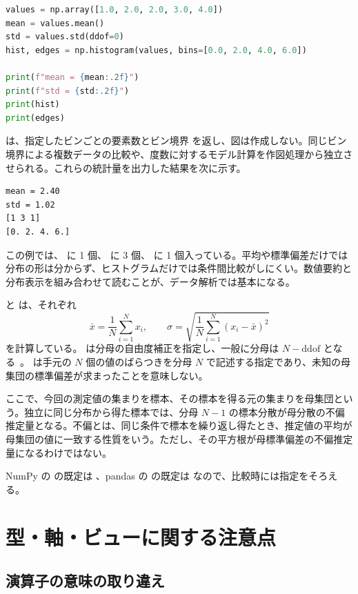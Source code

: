 \begin{lstlisting}[language=Python]
values = np.array([1.0, 2.0, 2.0, 3.0, 4.0])
mean = values.mean()
std = values.std(ddof=0)
hist, edges = np.histogram(values, bins=[0.0, 2.0, 4.0, 6.0])

print(f"mean = {mean:.2f}")
print(f"std = {std:.2f}")
print(hist)
print(edges)
\end{lstlisting}

 は、指定したビンごとの要素数とビン境界  を返し、図は作成しない。同じビン境界による複数データの比較や、度数に対するモデル計算を作図処理から独立させられる。これらの統計量を出力した結果を次に示す。

\begin{lstlisting}[numbers=none, xleftmargin=2\zw]
mean = 2.40
std = 1.02
[1 3 1]
[0. 2. 4. 6.]
\end{lstlisting}

この例では、\code{[0, 2)} に 1 個、\code{[2, 4)} に 3 個、\code{[4, 6]} に 1 個入っている。平均や標準偏差だけでは分布の形は分からず、ヒストグラムだけでは条件間比較がしにくい。数値要約と分布表示を組み合わせて読むことが、データ解析では基本になる。

 と  は、それぞれ
\[
\bar{x} = \frac{1}{N}\sum_{i=1}^{N} x_i,\qquad
\sigma = \sqrt{\frac{1}{N}\sum_{i=1}^{N} (x_i-\bar{x})^2}
\]
を計算している。 は分母の自由度補正を指定し、一般に分母は \(N-\mathrm{ddof}\) となる~\cite{numpy_std}。 は手元の \(N\) 個の値のばらつきを分母 \(N\) で記述する指定であり、未知の母集団の標準偏差が求まったことを意味しない。

ここで、今回の測定値の集まりを標本、その標本を得る元の集まりを母集団という。独立に同じ分布から得た標本では、分母 \(N-1\) の標本分散が母分散の不偏推定量となる。不偏とは、同じ条件で標本を繰り返し得たとき、推定値の平均が母集団の値に一致する性質をいう。ただし、その平方根が母標準偏差の不偏推定量になるわけではない。

NumPy の  の既定は 、pandas の  の既定は  なので、比較時には指定をそろえる。

\section{型・軸・ビューに関する注意点}

\subsection{演算子の意味の取り違え}

